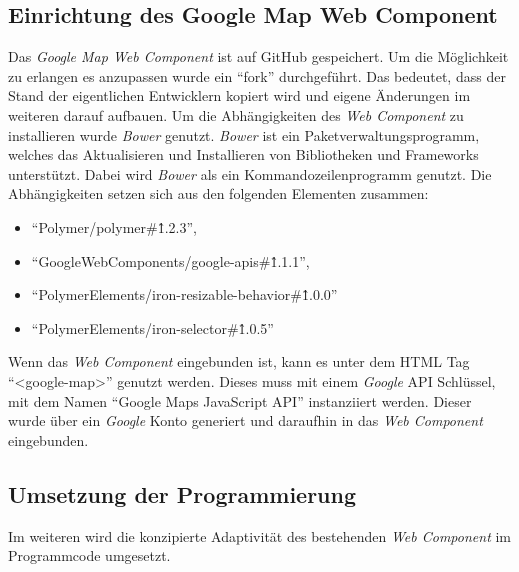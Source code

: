 \documentclass[12pt, paper=a4, bibtotoc, toc=listof, headsepline=true]{scrreprt}
\begin{document}
			\subsection{Einrichtung des Google Map Web Component}
			Das \emph{Google Map Web Component} ist auf GitHub gespeichert. Um die Möglichkeit zu erlangen es anzupassen wurde ein \enquote{fork} durchgeführt. Das bedeutet, dass der Stand der eigentlichen Entwicklern kopiert wird und eigene Änderungen im weiteren darauf aufbauen. Um die Abhängigkeiten des \emph{Web Component} zu installieren wurde \emph{Bower} genutzt. \emph{Bower} ist ein Paketverwaltungsprogramm, welches das Aktualisieren und Installieren von Bibliotheken und Frameworks unterstützt. Dabei wird \emph{Bower} als ein Kommandozeilenprogramm genutzt\cite{bower}. Die Abhängigkeiten setzen sich aus den folgenden Elementen zusammen:
			\begin{itemize}
				\item
				\enquote{Polymer/polymer\#\^1.2.3},
				\item
				\enquote{GoogleWebComponents/google-apis\#\^1.1.1},
				\item
				\enquote{PolymerElements/iron-resizable-behavior\#\^1.0.0}
				\item
				\enquote{PolymerElements/iron-selector\#\^1.0.5}
			\end{itemize}
			Wenn das \emph{Web Component} eingebunden ist, kann es unter dem \ac{HTML} Tag \enquote{<google-map>} genutzt werden. Dieses muss mit einem \emph{Google} \ac{API} Schlüssel, mit dem Namen \enquote{Google Maps JavaScript API} instanziiert werden. Dieser wurde über ein \emph{Google} Konto generiert und daraufhin in das \emph{Web Component} eingebunden. 
			\subsection{Umsetzung der Programmierung}
			Im weiteren wird die konzipierte Adaptivität des bestehenden \emph{Web Component} im Programmcode umgesetzt.
\end{document}
